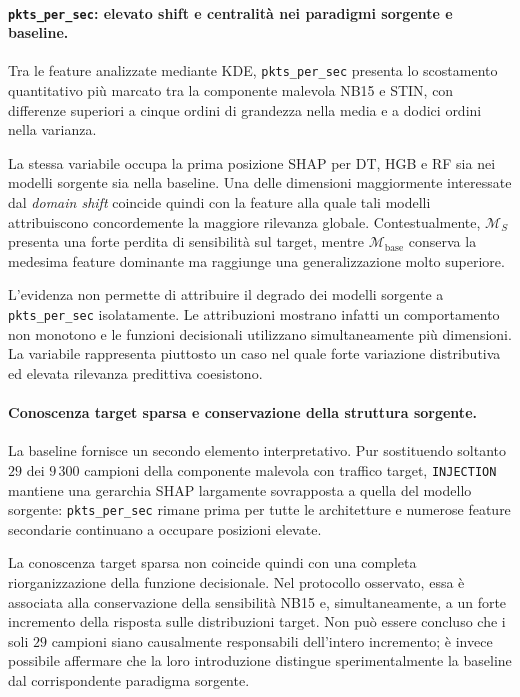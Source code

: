 \paragraph{\texttt{pkts\_per\_sec}: elevato shift e centralità nei paradigmi sorgente e baseline.}
Tra le feature analizzate mediante KDE, \texttt{pkts\_per\_sec} presenta lo scostamento quantitativo più marcato tra la componente malevola NB15 e STIN, con differenze superiori a cinque ordini di grandezza nella media e a dodici ordini nella varianza.

La stessa variabile occupa la prima posizione SHAP per DT, HGB e RF sia nei modelli sorgente sia nella baseline. 
Una delle dimensioni maggiormente interessate dal \textit{domain shift} coincide quindi con la feature alla quale tali modelli attribuiscono concordemente la maggiore rilevanza globale.
Contestualmente, $\mathcal{M}_{S}$ presenta una forte perdita di sensibilità sul target, mentre $\mathcal{M}_{\mathrm{base}}$ conserva la medesima feature dominante ma raggiunge una generalizzazione molto superiore.

L'evidenza non permette di attribuire il degrado dei modelli sorgente a \texttt{pkts\_per\_sec} isolatamente. 
Le attribuzioni mostrano infatti un comportamento non monotono e le funzioni decisionali utilizzano simultaneamente più dimensioni. 
La variabile rappresenta piuttosto un caso nel quale forte variazione distributiva ed elevata rilevanza predittiva coesistono.

\paragraph{Conoscenza target sparsa e conservazione della struttura sorgente.}
La baseline fornisce un secondo elemento interpretativo. 
Pur sostituendo soltanto $29$ dei $9\,300$ campioni della componente malevola con traffico target, \texttt{INJECTION} mantiene una gerarchia SHAP largamente sovrapposta a quella del modello sorgente: \texttt{pkts\_per\_sec} rimane prima per tutte le architetture e numerose feature secondarie continuano a occupare posizioni elevate.

La conoscenza target sparsa non coincide quindi con una completa riorganizzazione della funzione decisionale. 
Nel protocollo osservato, essa è associata alla conservazione della sensibilità NB15 e, simultaneamente, a un forte incremento della risposta sulle distribuzioni target. 
Non può essere concluso che i soli $29$ campioni siano causalmente responsabili dell'intero incremento; è invece possibile affermare che la loro introduzione distingue sperimentalmente la baseline dal corrispondente paradigma sorgente.

